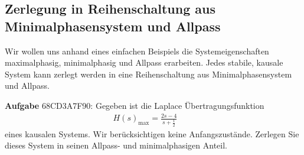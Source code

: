 \subsection{Zerlegung in Reihenschaltung aus Minimalphasensystem und Allpass}
\label{sec:68CD3A7F90}
\begin{Ziel}
Wir wollen uns anhand eines
einfachen Beispiels die Systemeigenschaften
maximalphasig, minimalphasig und Allpass erarbeiten.
Jedes stabile, kausale System kann zerlegt werden in eine Reihenschaltung aus
Minimalphasensystem und Allpass.
\end{Ziel}
\textbf{Aufgabe} {\tiny 68CD3A7F90}: Gegeben ist die Laplace
Übertragungsfunktion
\begin{align}
H(s)_\mathrm{max} = \frac{2 s-4}{s+\frac{1}{2}}\qquad
\end{align}
eines kausalen Systems. Wir berücksichtigen keine Anfangszustände.
Zerlegen Sie dieses System in seinen Allpass- und minimalphasigen Anteil.





